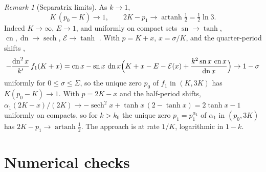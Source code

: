 \documentclass[11pt]{article}
\theoremstyle{remark}
\newtheorem{remark}[theorem]{Remark}
\newcommand{\sn}{\operatorname{sn}}
\newcommand{\cn}{\operatorname{cn}}
\newcommand{\dn}{\operatorname{dn}}
\newcommand{\epsi}{\mathcal{E}}
\begin{document}
\begin{remark}[Separatrix limits]\label{rem:separatrix}
As $k\to1$,
\begin{equation}\label{eq:separatrix}
 K\,(p_0-K)\to1,\qquad 2K-p_1\to\operatorname{artanh}\tfrac12=\tfrac12\ln3 .
\end{equation}
Indeed $K\to\infty$, $E\to1$, and uniformly on compact sets
$\sn\to\tanh$, $\cn,\dn\to\operatorname{sech}$, $\epsi\to\tanh$
\cite[\S22.5(ii)]{DLMF}.  With $p=K+x$, $x=\sigma/K$, and the quarter-period
shifts \cite[\S22.4]{DLMF},
\[
 -\frac{\dn^2x}{k'}\,f_1(K+x)=\cn x-\sn x\,\dn x\Bigl(K+x-E-\epsi(x)+\frac{k^2\sn x\,\cn x}{\dn x}\Bigr)\to1-\sigma
\]
uniformly for $0\le\sigma\le\Sigma$, so the unique zero $p_0$ of $f_1$ in
$(K,3K)$ has $K(p_0-K)\to1$.  With $p=2K-x$ and the half-period shifts,
$\alpha_1(2K-x)/(2K)\to-\operatorname{sech}^2x+\tanh x\,(2-\tanh x)=2\tanh x-1$
uniformly on compacts, so for $k>k_0$ the unique zero $p_1=p_1^{\alpha_1}$
of $\alpha_1$ in $(p_0,3K)$ has $2K-p_1\to\operatorname{artanh}\tfrac12$.
The approach is at rate $1/K$, logarithmic in $1-k$.
\end{remark}

\section{Numerical checks}\label{sec:numerics}
\end{document}
